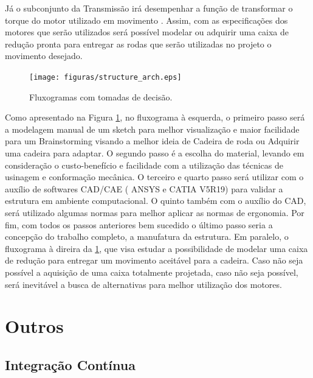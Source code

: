 Já o subconjunto da Transmissão irá desempenhar a função de 
transformar o torque do motor utilizado em movimento \cite{cardoso}. 
Assim, com as especificações dos motores que serão utilizados 
será possível modelar ou adquirir uma caixa de redução pronta para 
entregar as rodas que serão utilizadas no projeto o movimento desejado.

\begin{figure}[H]
  \centering
    \texttt{[image: figuras/structure\_arch.eps]}
  \caption{Fluxogramas com tomadas de decisão.}
  \label{fig:structure_arch}
\end{figure}

Como apresentado na Figura \ref{fig:structure_arch}, no fluxograma à esquerda, o primeiro passo 
será a modelagem manual de um sketch para melhor visualização 
e maior facilidade para um Brainstorming visando a melhor ideia 
de Cadeira de roda ou Adquirir uma cadeira para adaptar. 
O segundo passo é a escolha do material, levando em consideração 
o custo-benefício e facilidade com a utilização das técnicas de 
usinagem e conformação mecânica. O terceiro e quarto passo será 
utilizar com o auxílio de softwares CAD/CAE ( ANSYS e CATIA V5R19) 
para validar a estrutura em ambiente computacional. O quinto também 
com o auxílio do CAD, será utilizado algumas normas para melhor 
aplicar as normas de ergonomia. Por fim, com todos os passos anteriores bem sucedido o último passo seria a concepção do 
trabalho completo, a manufatura da estrutura. Em paralelo, o fluxograma à direira da \ref{fig:structure_arch}, 
que visa estudar a possibilidade de modelar uma caixa de redução 
para entregar um movimento aceitável para a cadeira. Caso não seja 
possível a 
aquisição de uma caixa totalmente projetada, caso não seja possível, 
será inevitável a busca de alternativas para melhor utilização dos motores.

\section{Outros}

\subsection{Integração Contínua}
